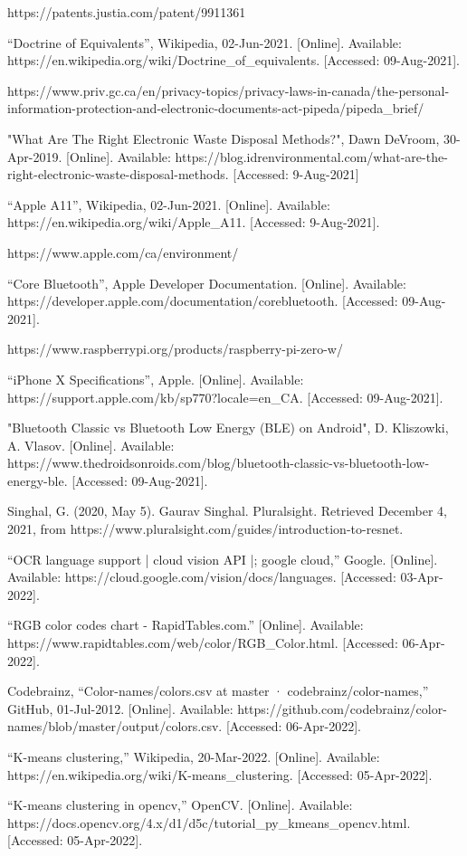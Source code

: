 \documentclass[a4paper,11pt]{article}
\begin{document}
\begin{thebibliography}{9}
https://patents.justia.com/patent/9911361

“Doctrine of Equivalents”, Wikipedia, 02-Jun-2021. [Online]. Available: https://en.wikipedia.org/wiki/Doctrine\_of\_equivalents. [Accessed: 09-Aug-2021].

https://www.priv.gc.ca/en/privacy-topics/privacy-laws-in-canada/the-personal-information-protection-and-electronic-documents-act-pipeda/pipeda\_brief/

"What Are The Right Electronic Waste Disposal Methods?", Dawn DeVroom, 30-Apr-2019. [Online]. Available: https://blog.idrenvironmental.com/what-are-the-right-electronic-waste-disposal-methods. [Accessed: 9-Aug-2021]

“Apple A11”, Wikipedia, 02-Jun-2021. [Online]. Available:
https://en.wikipedia.org/wiki/Apple\_A11. [Accessed: 9-Aug-2021].

https://www.apple.com/ca/environment/

“Core Bluetooth”, Apple Developer Documentation. [Online]. Available: https://developer.apple.com/documentation/corebluetooth. [Accessed: 09-Aug-2021]. 

https://www.raspberrypi.org/products/raspberry-pi-zero-w/

“iPhone X Specifications”, Apple. [Online]. Available: https://support.apple.com/kb/sp770?locale=en\_CA. [Accessed: 09-Aug-2021]. 

"Bluetooth Classic vs Bluetooth Low Energy (BLE) on Android", D. Kliszowki, A. Vlasov. [Online]. Available: https://www.thedroidsonroids.com/blog/bluetooth-classic-vs-bluetooth-low-energy-ble. [Accessed: 09-Aug-2021].

Singhal, G. (2020, May 5). Gaurav Singhal. Pluralsight. Retrieved December 4, 2021, from https://www.pluralsight.com/guides/introduction-to-resnet.

“OCR language support | cloud vision API |; google cloud,” Google. [Online]. Available: https://cloud.google.com/vision/docs/languages. [Accessed: 03-Apr-2022]. 

“RGB color codes chart - RapidTables.com.” [Online]. Available: https://www.rapidtables.com/web/color/RGB\_Color.html. [Accessed: 06-Apr-2022]. 

Codebrainz, “Color-names/colors.csv at master · codebrainz/color-names,” GitHub, 01-Jul-2012. [Online]. Available: https://github.com/codebrainz/color-names/blob/master/output/colors.csv. [Accessed: 06-Apr-2022]. 

“K-means clustering,” Wikipedia, 20-Mar-2022. [Online]. Available: https://en.wikipedia.org/wiki/K-means\_clustering. [Accessed: 05-Apr-2022].

“K-means clustering in opencv,” OpenCV. [Online]. Available: https://docs.opencv.org/4.x/d1/d5c/tutorial\_py\_kmeans\_opencv.html. [Accessed: 05-Apr-2022]. 

\end{thebibliography}
\end{document}
